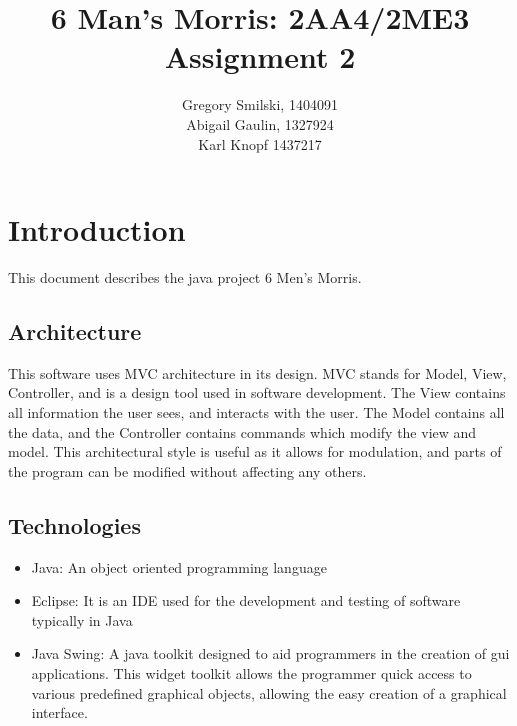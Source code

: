 \documentclass[12pt]{article}
\begin{document}
	\title{6 Man's Morris: 2AA4/2ME3 Assignment 2} %
	\author{
		Gregory Smilski, 1404091\\
		Abigail Gaulin, 1327924\\
		Karl Knopf 1437217} 
	
	\maketitle
	\thispagestyle{empty}
	\newpage
	\tableofcontents
	\newpage
	
	\section{Introduction}
	This document describes the java project 6 Men's Morris. 
	\subsection{Architecture}
	\begin{figure}[!h]
		\centering
	\end{figure}
	This software uses MVC architecture in its design. MVC stands for Model, View, Controller, and is a design tool used in software development. The View contains all information the user sees, and interacts with the user. The Model contains all the data, and the Controller contains commands which modify the view and model. This architectural style is useful as it allows for modulation, and parts of the program can be modified without affecting any others.
	\subsection{Technologies}
	\begin{itemize}
		\item Java:  An object oriented programming language 
		\item Eclipse: It is an IDE used for the development and testing of software typically in Java
		\item Java Swing: A java toolkit designed to aid programmers in the creation of gui applications. This widget toolkit allows the programmer quick access to various predefined graphical objects, allowing the easy creation of a graphical interface.
		
	\end{itemize}
\end{document}
